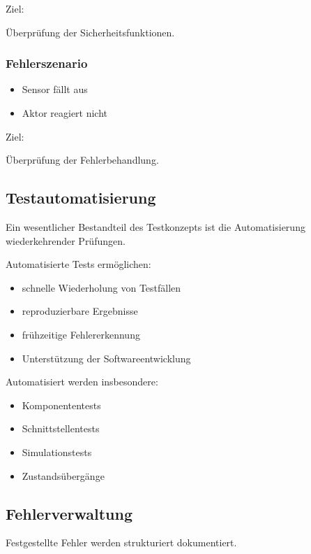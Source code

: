 Ziel:

Überprüfung der Sicherheitsfunktionen.

\subsubsection{Fehlerszenario}\label{fehlerszenario}

\begin{itemize}
\tightlist
\item
  Sensor fällt aus
\item
  Aktor reagiert nicht
\end{itemize}

Ziel:

Überprüfung der Fehlerbehandlung.

\subsection{Testautomatisierung}\label{testautomatisierung}

Ein wesentlicher Bestandteil des Testkonzepts ist die Automatisierung
wiederkehrender Prüfungen.

Automatisierte Tests ermöglichen:

\begin{itemize}
\tightlist
\item
  schnelle Wiederholung von Testfällen
\item
  reproduzierbare Ergebnisse
\item
  frühzeitige Fehlererkennung
\item
  Unterstützung der Softwareentwicklung
\end{itemize}

Automatisiert werden insbesondere:

\begin{itemize}
\tightlist
\item
  Komponententests
\item
  Schnittstellentests
\item
  Simulationstests
\item
  Zustandsübergänge
\end{itemize}

\subsection{Fehlerverwaltung}\label{fehlerverwaltung}

Festgestellte Fehler werden strukturiert dokumentiert.

